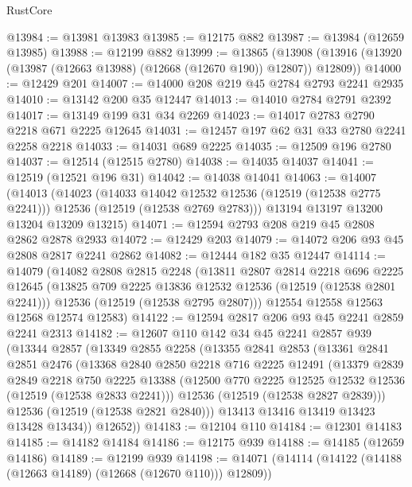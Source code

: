 \begin{lexlean}{RustCore}
\begin{coremodule}
@13984 := @13981 @13983
@13985 := @12175 @882
@13987 := @13984 (@12659 @13985)
@13988 := @12199 @882
@13999 := @13865
    (@13908 (@13916 (@13920 (@13987 (@12663 @13988) (@12668 (@12670 @190)) @12807)) @12809))
@14000 := @12429 @201
@14007 := @14000 @208 @219 @45 @2784 @2793 @2241 @2935
@14010 := @13142 @200 @35 @12447
@14013 := @14010 @2784 @2791 @2392
@14017 := @13149 @199 @31 @34 @2269
@14023 := @14017 @2783 @2790 @2218 @671 @2225 @12645
@14031 := @12457 @197 @62 @31 @33 @2780 @2241 @2258 @2218
@14033 := @14031 @689 @2225
@14035 := @12509 @196 @2780
@14037 := @12514 (@12515 @2780)
@14038 := @14035 @14037
@14041 := @12519 (@12521 @196 @31)
@14042 := @14038 @14041
@14063 := @14007
    (@14013
      (@14023
        (@14033 @14042 @12532 @12536 (@12519 (@12538 @2775 @2241)))
        @12536
        (@12519 (@12538 @2769 @2783)))
      @13194
      @13197
      @13200
      @13204
      @13209
      @13215)
@14071 := @12594 @2793 @208 @219 @45 @2808 @2862 @2878 @2933
@14072 := @12429 @203
@14079 := @14072 @206 @93 @45 @2808 @2817 @2241 @2862
@14082 := @12444 @182 @35 @12447
@14114 := @14079
    (@14082
      @2808
      @2815
      @2248
      (@13811
        @2807
        @2814
        @2218
        @696
        @2225
        @12645
        (@13825 @709 @2225 @13836 @12532 @12536 (@12519 (@12538 @2801 @2241)))
        @12536
        (@12519 (@12538 @2795 @2807)))
      @12554
      @12558
      @12563
      @12568
      @12574
      @12583)
@14122 := @12594 @2817 @206 @93 @45 @2241 @2859 @2241 @2313
@14182 := @12607
    @110
    @142
    @34
    @45
    @2241
    @2857
    @939
    (@13344
      @2857
      (@13349
        @2855
        @2258
        (@13355
          @2841
          @2853
          (@13361
            @2841
            @2851
            @2476
            (@13368
              @2840
              @2850
              @2218
              @716
              @2225
              @12491
              (@13379
                @2839
                @2849
                @2218
                @750
                @2225
                @13388
                (@12500 @770 @2225 @12525 @12532 @12536 (@12519 (@12538 @2833 @2241)))
                @12536
                (@12519 (@12538 @2827 @2839)))
              @12536
              (@12519 (@12538 @2821 @2840)))
            @13413
            @13416
            @13419
            @13423
            @13428
            @13434))
        @12652))
@14183 := @12104 @110
@14184 := @12301 @14183
@14185 := @14182 @14184
@14186 := @12175 @939
@14188 := @14185 (@12659 @14186)
@14189 := @12199 @939
@14198 := @14071 (@14114 (@14122 (@14188 (@12663 @14189) (@12668 (@12670 @110))) @12809))

\end{coremodule}
\end{lexlean}
